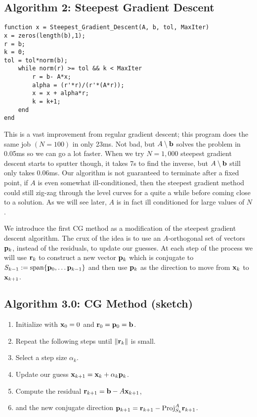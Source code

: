 \documentclass{article}
\newcommand{\bx}{{\bf x}}
\newcommand{\bb}{{\bf b}}
\newcommand{\br}{{\bf r}}
\newcommand{\bp}{{\bf p}}
\theoremstyle{remark}
\begin{document}
\subsection{Algorithm 2: Steepest Gradient Descent}
\begin{lstlisting}
function x = Steepest_Gradient_Descent(A, b, tol, MaxIter)
x = zeros(length(b),1);
r = b;
k = 0;   
tol = tol*norm(b);
    while norm(r) >= tol && k < MaxIter
        r = b- A*x;
        alpha = (r'*r)/(r'*(A*r));
        x = x + alpha*r;
        k = k+1;
    end
end
\end{lstlisting}

This is a vast improvement from regular gradient descent; this program does the same job $(N=100)$ in only 23ms. Not bad, but $A\setminus \bb$ solves the problem in 0.05ms so we can go a lot faster. When we try $N = 1,000$ steepest gradient descent starts to sputter though, it takes 7s to find the inverse, but $A\setminus \bb$ still only takes 0.06ms. Our algorithm is not guaranteed to terminate after a fixed point, if $A$ is even somewhat ill-conditioned, then the steepest gradient method could still zig-zag through the level curves for a quite a while before coming close to a solution. As we will see later, $A$ is in fact ill conditioned for large values of $N$. 

We introduce the first CG method as a modification of the steepest gradient descent algorithm. The crux of the idea is to use an $A$-orthogonal set of vectors $\bp_k$, instead of the residuals, to update our guesses. At each step of the process we will use $\br_k$ to construct a new vector $\bp_k$ which is conjugate to $S_{k-1} := \text{span}\{\bp_0, \dots \bp_{k-1} \}$ and then use $\bp_k$ as the direction to move from $\bx_k$ to $\bx_{k+1}$. 

\subsection{Algorithm 3.0: CG Method (sketch)}
\begin{enumerate}
\item Initialize with $\bx_0=0$ and $\br_0 = \bp_0 = \bb$.
\item Repeat the following steps until $\|\br_k\|$ is small.
\item Select a step size $\alpha_k$.
\item Update our guess $\bx_{k+1}  = \bx_k + \alpha_k \bp_k$.
\item Compute the residual $\br_{k+1} = \bb - A\bx_{k+1}$,
\item and the new conjugate direction $\bp_{k+1} = \br_{k+1} - \text{Proj}^{A}_{S_k}\br_{k+1}$.

\end{enumerate}
\end{document}
